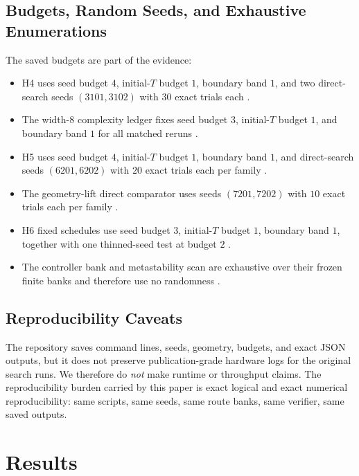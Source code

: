 \documentclass[11pt]{article}
\theoremstyle{definition}
\begin{document}
\subsection{Budgets, Random Seeds, and Exhaustive Enumerations}

The saved budgets are part of the evidence:
\begin{itemize}
  \item H4 uses seed budget $4$, initial-$T$ budget $1$, boundary band $1$, and two direct-search seeds $(3101,3102)$ with $30$ exact trials each \citep{archivara_h4_typed_interfaces}.
  \item The width-$8$ complexity ledger fixes seed budget $3$, initial-$T$ budget $1$, and boundary band $1$ for all matched reruns \citep{archivara_complexity_frontier}.
  \item H5 uses seed budget $4$, initial-$T$ budget $1$, boundary band $1$, and direct-search seeds $(6201,6202)$ with $20$ exact trials each per family \citep{archivara_h5_affine_shell}.
  \item The geometry-lift direct comparator uses seeds $(7201,7202)$ with $10$ exact trials each per family \citep{archivara_geometry_lift}.
  \item H6 fixed schedules use seed budget $3$, initial-$T$ budget $1$, boundary band $1$, together with one thinned-seed test at budget $2$ \citep{archivara_h6_defect_transport}.
  \item The controller bank and metastability scan are exhaustive over their frozen finite banks and therefore use no randomness \citep{archivara_boundary_controller,archivara_metastability}.
\end{itemize}

\subsection{Reproducibility Caveats}

The repository saves command lines, seeds, geometry, budgets, and exact JSON outputs, but it does not preserve publication-grade hardware logs for the original search runs. We therefore do \emph{not} make runtime or throughput claims. The reproducibility burden carried by this paper is exact logical and exact numerical reproducibility: same scripts, same seeds, same route banks, same verifier, same saved outputs.

\section{Results}
\label{sec:results}
\end{document}
